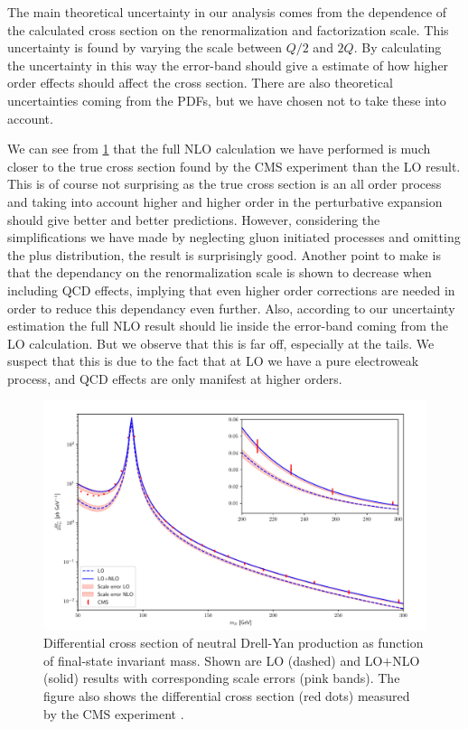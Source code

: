 The main theoretical uncertainty in our analysis comes from the dependence of the calculated cross section on the renormalization and factorization scale. This uncertainty is found by varying the scale between $Q/2$ and $2Q$. By calculating the uncertainty in this way the error-band should give a estimate of how higher order effects should affect the cross section. There are also theoretical uncertainties coming from the PDFs, but we have chosen not to take these into account.

We can see from \cref{fig:numerical LO and NLO cross section} that the full NLO calculation we have performed is much closer to the true cross section found by the CMS experiment than the LO result. This is of course not surprising as the true cross section is an all order process and taking into account higher and higher order in the perturbative expansion should give better and better predictions. However, considering the simplifications we have made by neglecting gluon initiated processes and omitting the plus distribution, the result is surprisingly good. Another point to make is that the dependancy on the renormalization scale is shown to decrease when including QCD effects, implying that even higher order corrections are needed in order to reduce this dependancy even further. Also, according to our uncertainty estimation the full NLO result should lie inside the error-band coming from the LO calculation. But we observe that this is far off, especially at the tails. We suspect that this is due to the fact that at LO we have a pure electroweak process, and QCD effects are only manifest at higher orders. 

\begin{figure}[H]
    \centering
    \includegraphics[width=\linewidth]{Figures/dsigmadmll.pdf}
    \caption{Differential cross section of neutral Drell-Yan production as function of final-state invariant mass. Shown are LO (dashed) and LO$+$NLO (solid) results with corresponding scale errors (pink bands). The figure also shows the differential cross section (red dots) measured by the CMS experiment \cite{Sirunyan:2018owv}.}
    \label{fig:numerical LO and NLO cross section}
\end{figure}